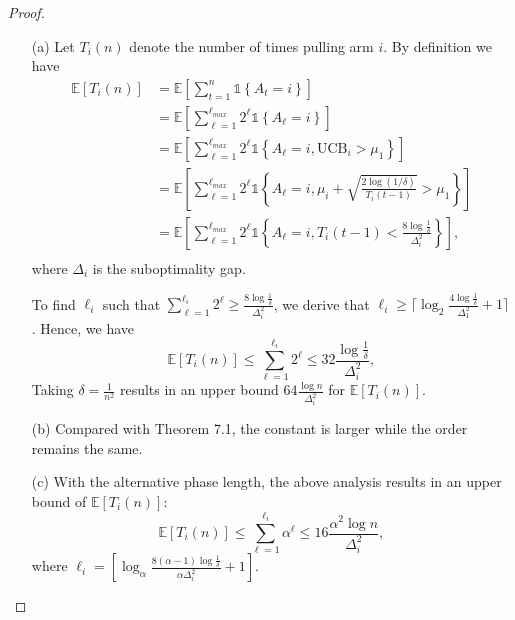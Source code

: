 \begin{proof}
    \begin{enumerate}
        \item[(a)] Let $T_{i}(n)$ denote the number of times pulling arm $i$.
        By definition we have
        $$
        \begin{aligned}
            \mathbb{E}\left[T_{i}(n)\right]
            &=\mathbb{E}\left[ \sum_{t=1}^{n} \mathbb{1}\left\{A_{t}=i\right\}\right]\\
            &=\mathbb{E}\left[ \sum_{\ell=1}^{\ell_{max}} 2^\ell \mathbb{1}\left\{A_{\ell}=i\right\}\right]\\
            &=\mathbb{E}\left[ \sum_{\ell=1}^{\ell_{max}} 2^\ell \mathbb{1}\left\{A_{\ell}=i, \mathrm{UCB}_{i} > \mu_1\right\}\right]\\
            &=\mathbb{E}\left[ \sum_{\ell=1}^{\ell_{max}} 2^\ell \mathbb{1}\left\{A_{\ell}=i, \mu_{i} + \sqrt{\frac{2 \log (1 / \delta)}{T_{i}(t-1)}} > \mu_1\right\}\right]\\
            &=\mathbb{E}\left[ \sum_{\ell=1}^{\ell_{max}} 2^\ell \mathbb{1}\left\{A_{\ell}=i, T_{i}(t-1) < \frac{8 \log \frac{1}{\delta}}{\Delta_{i}^{2}} \right\}\right],\\
        \end{aligned}
        $$
        where $\Delta_i$ is the suboptimality gap.

        To find $\ell_i$ such that $\sum_{\ell=1}^{\ell_{i}} 2^{\ell} \geq \frac{8 \log \frac{1}{\delta}}{\Delta_{i}^{2}}$, we derive that $\ell_i \geq \lceil \log _{2} \frac{4 \log \frac{1}{\delta}}{\Delta_{1}^{2}}+1 \rceil$.
        Hence, we have
        $$
            \mathbb{E}\left[T_{i}(n)\right] \leq \sum_{\ell = 1}^{\ell_i} 2^\ell \leq 32 \frac{\log \frac{1}{\delta}}{\Delta_i^2},
        $$
        Taking $\delta = \frac{1}{n^2}$ results in an upper bound $64\frac{\log n}{\Delta_{i}^{2}}$ for $\mathbb{E}\left[T_{i}(n)\right]$.
    
        \item[(b)] Compared with Theorem 7.1, the constant is larger while the order remains the same.
        
        \item[(c)] With the alternative phase length, the above analysis results in an upper bound of $\mathbb{E}\left[T_{i}(n)\right]$:
        $$
            \mathbb{E}\left[T_{i}(n)\right] \leq \sum_{\ell = 1}^{\ell_i} \alpha^\ell \leq 16\frac{\alpha^{2} \log n}{\Delta_i^{2}},
        $$
        where $\ell_{i}=\left[\log _{\alpha} \frac{8(\alpha-1) \log \frac{1}{\delta}}{\alpha \Delta_i^{2}}+1\right]$.
    \end{enumerate}
\end{proof}

